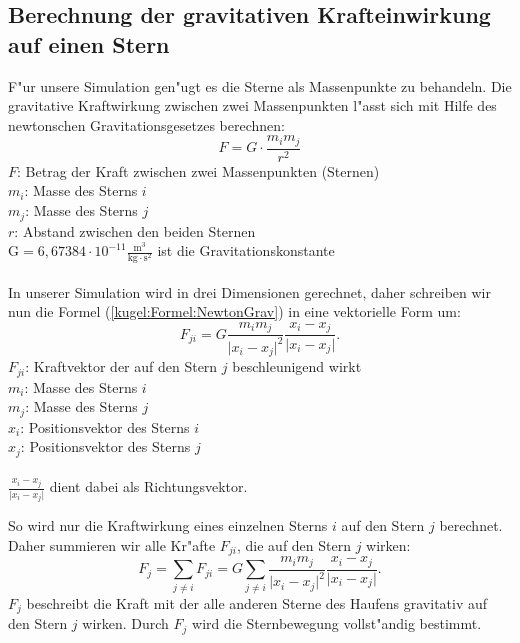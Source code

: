 \begin{refsection}
\subsection{Berechnung der gravitativen Krafteinwirkung auf einen Stern} \label{kugel:subsection:Kraftformel}
F"ur unsere Simulation gen"ugt es die Sterne als Massenpunkte zu behandeln. 
Die gravitative Kraftwirkung zwischen zwei Massenpunkten l"asst sich
mit Hilfe des newtonschen Gravitationsgesetzes berechnen:
\begin{equation}
	F = G \cdot \dfrac{m_i m_j}{r^2}
	\label{kugel:Formel:NewtonGrav}
\end{equation}
$F$: Betrag der Kraft zwischen zwei Massenpunkten (Sternen) \\
$m_i$: Masse des Sterns $i$ \\
$m_j$: Masse des Sterns $j$ \\
$r$: Abstand zwischen den beiden Sternen \\
$\mathrm{G = 6,67384 \cdot 10^{-11} \frac{m^3}{kg \cdot s^2}}$
ist die Gravitationskonstante \\ \\
In unserer Simulation wird in drei Dimensionen gerechnet, daher schreiben
wir nun die Formel (\ref{kugel:Formel:NewtonGrav}) in eine vektorielle
Form um:
\begin{equation}
	F_{ji} = G \dfrac{m_i m_j}{\lvert x_i -  x_j \lvert^2} \dfrac{x_i - x_j}{\lvert x_i - x_j \lvert}
	\label{kugel:Formel:NewtonGravVek}.
\end{equation}
$F_{ji}$: Kraftvektor der auf den Stern $j$ beschleunigend wirkt \\
$m_i$: Masse des Sterns $i$ \\
$m_j$: Masse des Sterns $j$ \\
$x_i$: Positionsvektor des Sterns $i$ \\
$x_j$: Positionsvektor des Sterns $j$  \\ \\
$\displaystyle \frac{ x_i -  x_j}{\lvert  x_i -  x_j \lvert}$ dient
dabei als Richtungsvektor.
	
So wird nur die Kraftwirkung eines einzelnen Sterns $i$ auf den Stern
$j$ berechnet.
Daher summieren wir alle Kr"afte $F_{ji}$, die auf den Stern $j$ wirken:
\begin{equation}
	 F_j = \sum_{j \neq i} F_{ji} = G \sum_{j \neq i} \dfrac{m_i m_j}{\lvert x_i - x_j \lvert^2} \dfrac{x_i - x_j}{\lvert x_i - x_j \lvert}
	\label{kugel:Formel:NewtonGravVekSum}.
\end{equation}
$F_j$ beschreibt die Kraft mit der alle anderen Sterne des Haufens
gravitativ auf den Stern $j$ wirken.
Durch $F_j$ wird die Sternbewegung vollst"andig bestimmt.
		

\end{refsection}
